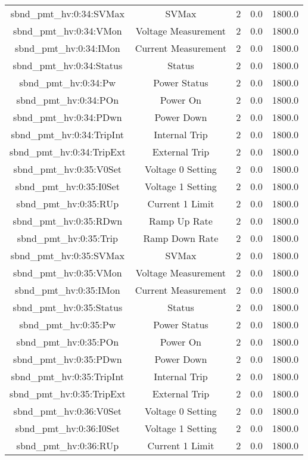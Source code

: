 \begin{table}[ptb]
\begin{tabular}{c | c c c c}
sbnd_pmt_hv:0:34:SVMax & SVMax & 2 & 0.0 & 1800.0\\ 
sbnd_pmt_hv:0:34:VMon & Voltage Measurement & 2 & 0.0 & 1800.0\\ 
sbnd_pmt_hv:0:34:IMon & Current Measurement & 2 & 0.0 & 1800.0\\ 
sbnd_pmt_hv:0:34:Status & Status & 2 & 0.0 & 1800.0\\ 
sbnd_pmt_hv:0:34:Pw & Power Status & 2 & 0.0 & 1800.0\\ 
sbnd_pmt_hv:0:34:POn & Power On & 2 & 0.0 & 1800.0\\ 
sbnd_pmt_hv:0:34:PDwn & Power Down & 2 & 0.0 & 1800.0\\ 
sbnd_pmt_hv:0:34:TripInt & Internal Trip & 2 & 0.0 & 1800.0\\ 
sbnd_pmt_hv:0:34:TripExt & External Trip & 2 & 0.0 & 1800.0\\ 
sbnd_pmt_hv:0:35:V0Set & Voltage 0 Setting & 2 & 0.0 & 1800.0\\ 
sbnd_pmt_hv:0:35:I0Set & Voltage 1 Setting & 2 & 0.0 & 1800.0\\ 
sbnd_pmt_hv:0:35:RUp & Current 1 Limit & 2 & 0.0 & 1800.0\\ 
sbnd_pmt_hv:0:35:RDwn & Ramp Up Rate & 2 & 0.0 & 1800.0\\ 
sbnd_pmt_hv:0:35:Trip & Ramp Down Rate & 2 & 0.0 & 1800.0\\ 
sbnd_pmt_hv:0:35:SVMax & SVMax & 2 & 0.0 & 1800.0\\ 
sbnd_pmt_hv:0:35:VMon & Voltage Measurement & 2 & 0.0 & 1800.0\\ 
sbnd_pmt_hv:0:35:IMon & Current Measurement & 2 & 0.0 & 1800.0\\ 
sbnd_pmt_hv:0:35:Status & Status & 2 & 0.0 & 1800.0\\ 
sbnd_pmt_hv:0:35:Pw & Power Status & 2 & 0.0 & 1800.0\\ 
sbnd_pmt_hv:0:35:POn & Power On & 2 & 0.0 & 1800.0\\ 
sbnd_pmt_hv:0:35:PDwn & Power Down & 2 & 0.0 & 1800.0\\ 
sbnd_pmt_hv:0:35:TripInt & Internal Trip & 2 & 0.0 & 1800.0\\ 
sbnd_pmt_hv:0:35:TripExt & External Trip & 2 & 0.0 & 1800.0\\ 
sbnd_pmt_hv:0:36:V0Set & Voltage 0 Setting & 2 & 0.0 & 1800.0\\ 
sbnd_pmt_hv:0:36:I0Set & Voltage 1 Setting & 2 & 0.0 & 1800.0\\ 
sbnd_pmt_hv:0:36:RUp & Current 1 Limit & 2 & 0.0 & 1800.0\\ 

\end{tabular}
\end{table}
